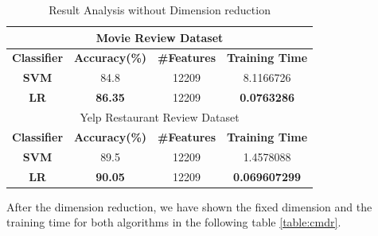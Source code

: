 \documentclass[10pt, conference]{IEEEtran}
\begin{document}
	\begin{table}[H]
		\caption{Result Analysis without Dimension reduction}
		\begin{center}
		\begin{tabular}{|*{4}{c|}}
        \hline
        \multicolumn{4}{|c|}{Movie Review Dataset}\\
        \hline
        \textbf{Classifier} & \textbf{Accuracy(\%)} & \textbf{\#Features} & \textbf{Training Time}\\
        \hline
        \textbf{SVM} & 84.8 & 12209 & 8.1166726\\
        \hline
        \textbf{LR} & \textbf{86.35} & 12209 & \textbf{0.0763286}\\
        \hline
        \multicolumn{4}{|c|}{Yelp Restaurant Review Dataset}\\
        \hline
         \textbf{Classifier} & \textbf{Accuracy(\%)} & \textbf{\#Features} & \textbf{Training Time}\\
        \hline
        \textbf{SVM} & 89.5 & 12209 & 1.4578088\\
        \hline
        \textbf{LR} & \textbf{90.05} & 12209 & \textbf{0.069607299}\\
        \hline
        \end{tabular}
			\label{table:rwodr}
		\end{center}
	\end{table}
	
	After the dimension reduction, we have shown the fixed dimension and the training time for both algorithms in the following table \ref{table:cmdr}.
	
\end{document}
